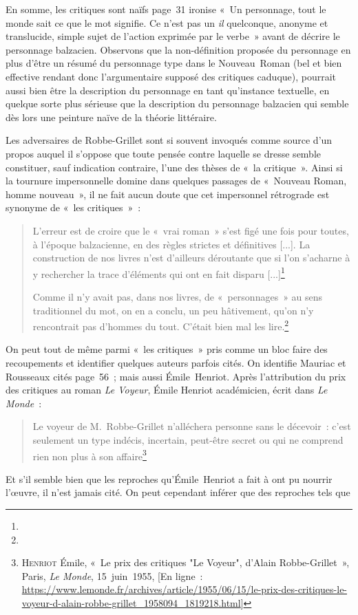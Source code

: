 En somme, les critiques sont naïfs page~31 \robbe{} ironise «~Un personnage, tout le monde sait ce que le mot signifie. Ce n’est pas un \textit{il} quelconque, anonyme et translucide, simple sujet de l’action exprimée par le verbe~» avant de décrire le personnage balzacien. Observons que la non-définition proposée du personnage en plus d'être un résumé du personnage type dans le Nouveau~Roman (bel et bien effective rendant donc l'argumentaire supposé des critiques caduque), pourrait aussi bien être la description du personnage en tant qu'instance textuelle, en quelque sorte plus sérieuse que la description du personnage balzacien qui semble dès lors une peinture naïve de la théorie littéraire. 

Les adversaires de Robbe-Grillet sont si souvent invoqués comme source d'un propos auquel il s'oppose que toute pensée contre laquelle se dresse \robbe{} semble constituer, sauf indication contraire, l'une des thèses de «~la critique~». Ainsi si la tournure impersonnelle domine dans quelques passages de «~Nouveau Roman, homme nouveau~», il ne fait aucun doute que cet impersonnel rétrograde est synonyme de «~les critiques~»~:
\begin{quote}
    L'erreur est de croire que le «~vrai roman~» s’est figé une fois pour toutes, à l’époque balzacienne, en des règles strictes et définitives [...]. La construction de nos livres n’est d’ailleurs déroutante que si l’on s’acharne à y rechercher la trace d’éléments qui ont en fait disparu [...]\footnote{}

    Comme il n’y avait pas, dans nos livres, de «~personnages~» au sens traditionnel du mot, on en a conclu, un peu hâtivement, qu’on n’y rencontrait pas d’hommes du tout. C’était bien mal les lire.\footnote{}
\end{quote}

On peut tout de même parmi «~les critiques~» pris comme un bloc faire des recoupements et identifier quelques auteurs parfois cités.
On identifie Mauriac et Rousseaux cités page~56~; mais aussi Émile~Henriot. Après l'attribution du prix des critiques au roman \textit{Le Voyeur}, Émile Henriot académicien, écrit dans \textit{Le Monde}~:
\begin{quote}
    Le voyeur de M.~Robbe-Grillet n'alléchera personne sans le décevoir~: c'est seulement un type indécis, incertain, peut-être secret ou qui ne comprend rien non plus à son affaire\footnote{\textsc{Henriot} Émile, «~Le prix des critiques "Le Voyeur", d'Alain Robbe-Grillet~», Paris, \textit{Le Monde}, 15~juin~1955, [En ligne~: \href{https://www.lemonde.fr/archives/article/1955/06/15/le-prix-des-critiques-le-voyeur-d-alain-robbe-grillet_1958094_1819218.html}{https://www.lemonde.fr/archives/article/1955/06/15/le-prix-des-critiques-le-voyeur-d-alain-robbe-grillet\_1958094\_1819218.html}]}
\end{quote}
Et s'il semble bien que les reproches qu'Émile~Henriot a fait à \robbe{} ont pu nourrir l'œuvre, il n'est jamais cité. On peut cependant inférer que des reproches tels que 

